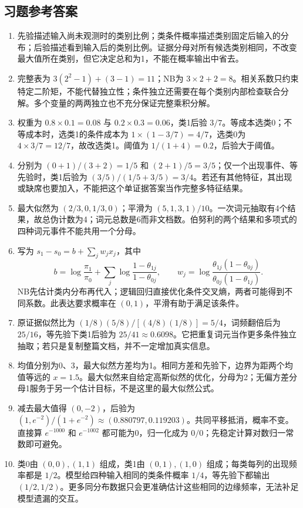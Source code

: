 \documentclass[UTF8,fontset=none,zihao=-4,a4paper]{ctexart}
\numberwithin{equation}{section}
\numberwithin{figure}{section}
\begin{document}
\clearpage\subsection{习题参考答案}
\begin{enumerate}[label=16.\arabic*]
\item 先验描述输入尚未观测时的类别比例；类条件概率描述类别固定后输入的分布；后验描述看到输入后的类别比例。证据分母对所有候选类别相同，不改变最大值所在类别，但它决定总和为1，不能在概率输出中省去。
\item 完整表为 $3(2^2-1)+(3-1)=11$；NB为 $3\times2+2=8$。相关系数只约束特定二阶矩，不能代替独立性；条件独立还需要在每个类别内部检查联合分解。多个变量的两两独立也不充分保证完整乘积分解。
\item 权重为 $0.8\times0.1=0.08$ 与 $0.2\times0.3=0.06$，类1后验 $3/7$。等成本选类0；不等成本时，选类1的条件成本为 $1\times(1-3/7)=4/7$，选类0为 $4\times3/7=12/7$，故改选类1。阈值为 $1/(1+4)=0.2$，后验大于阈值。
\item 分别为 $(0+1)/(3+2)=1/5$ 和 $(2+1)/5=3/5$；仅一个出现事件、等先验时，类1后验为 $(3/5)/(1/5+3/5)=3/4$。若还有其他特征，其出现或缺席也要加入，不能把这个单证据答案当作完整多特征结果。
\item 最大似然为 $(2/3,0,1/3,0)$；平滑为 $(5,1,3,1)/10$。一次词元抽取有4个结果，故总伪计数为4；词元总数是6而非文档数。伯努利的两个结果和多项式的四种词元事件不能共用一个分母。
\item 写为 $s_1-s_0=b+\sum_jw_jx_j$，其中
\[
 b=\log\frac{\pi_1}{\pi_0}+\sum_j\log\frac{1-\theta_{1j}}{1-\theta_{0j}},\qquad
 w_j=\log\frac{\theta_{1j}(1-\theta_{0j})}{\theta_{0j}(1-\theta_{1j})}.
\]
NB先估计类内分布再代入；逻辑回归直接优化条件交叉熵，两者可能得到不同系数。此表达要求概率在 $(0,1)$，平滑有助于满足该条件。
\newpage
\item 原证据似然比为 $(1/8)(5/8)/[(4/8)(1/8)]=5/4$，词频翻倍后为 $25/16$，等先验下类1后验为 $25/41\approx0.6098$。它把重复词元当作更多条件独立抽取；若只是复制整篇文档，并不一定增加真实信息。
\item 均值分别为0、3，最大似然方差均为1。相同方差和先验下，边界为距两个均值等远的 $x=1.5$。最大似然来自给定高斯似然的优化，分母为2；无偏方差分母1服务于另一个估计目标，不是这里的最大似然公式。
\item 减去最大值得 $(0,-2)$，后验为 $(1,e^{-2})/(1+e^{-2})\approx(0.880797,0.119203)$。共同平移抵消，概率不变。直接算 $e^{-1000}$ 和 $e^{-1002}$ 都可能为0，归一化成为 $0/0$；先稳定计算对数归一常数即可避免。
\item 类0由 $(0,0),(1,1)$ 组成，类1由 $(0,1),(1,0)$ 组成；每类每列的出现频率都是 $1/2$。模型给四种输入相同的类条件概率 $1/4$，等先验下都输出 $(1/2,1/2)$。更多同分布数据只会更准确估计这些相同的边缘频率，无法补足模型遗漏的交互。

\end{enumerate}
\end{document}
